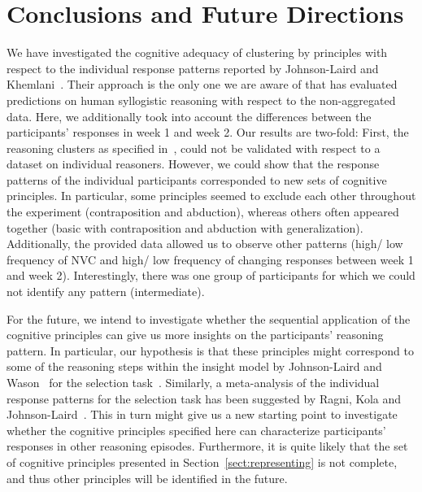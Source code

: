 \documentclass[12pt]{article}
\begin{document}
 \section{Conclusions and Future Directions}
 
 
We have investigated the cognitive adequacy of clustering by principles with respect to the individual response patterns reported by Johnson-Laird and Khemlani~\cite{khemlani:2016}.
Their approach is the only one we are aware of that has evaluated predictions on human syllogistic reasoning
with respect to the non-aggregated data.
Here, we additionally took into account the differences between the participants' responses in week 1 and week 2. 
Our results are two-fold: First, the reasoning clusters as specified in~\cite{declare:2017}, could not be validated
with respect to a dataset on individual reasoners. However, we could show that the response patterns of the individual participants corresponded to new sets of cognitive principles. In particular,
some principles seemed to exclude each other throughout the experiment (contraposition and abduction), whereas others often appeared together (basic with contraposition and abduction with generalization).
Additionally, the provided data allowed us to observe other patterns (high/ low frequency of NVC and high/ low frequency of changing responses between week 1 and week 2). 
Interestingly, there was one group of participants for which we could not identify any pattern (intermediate). 

For the future, we intend to investigate whether the sequential application of the cognitive principles 
can give us more insights on the participants' reasoning pattern. In particular, our hypothesis is that these principles might correspond to some of the reasoning steps within the insight model
by Johnson-Laird and Wason~\cite{johnsonlaird:1970} for the selection task~\cite{wason:68}.
Similarly, a meta-analysis of the individual response patterns for the selection task has been suggested by Ragni, Kola and Johnson-Laird~\cite{ragni:2017}.
This in turn might give us a new starting point to investigate whether the cognitive principles  specified here can characterize participants' responses in other reasoning episodes.
Furthermore, it is quite likely that the set of cognitive principles presented in Section~\ref{sect:representing} is not complete, and thus other principles will be identified in the future.





\end{document}
